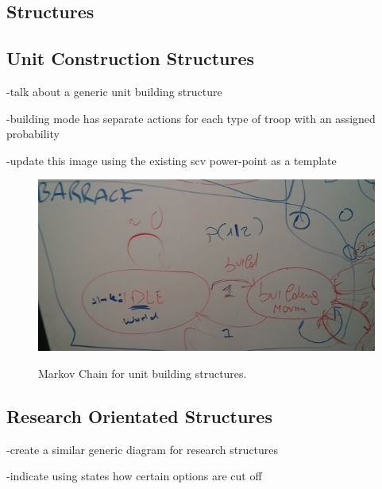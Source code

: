 \subsection{Structures}

\subsection{Unit Construction Structures}

-talk about a generic unit building structure

-building mode has separate actions for each type of troop with an assigned probability

-update this image using the existing scv power-point as a template

\begin{figure}
\centering
\includegraphics[scale=0.8, trim = 0cm 0cm 0cm 0cm]{diagrams/barracks}
\label{fig:barracks_diagram}
\caption{Markov Chain for unit building structures.}
\end{figure}

\subsection{Research Orientated Structures}

-create a similar generic diagram for research structures

-indicate using states how certain options are cut off